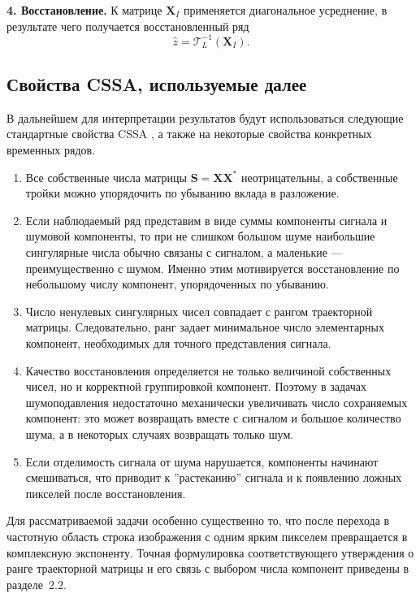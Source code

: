 \textbf{4. Восстановление.}
К матрице $\mathbf{X}_I$ применяется диагональное усреднение, в результате чего получается восстановленный ряд
\[
\widehat{z} = \mathcal{T}_L^{-1}(\mathbf{X}_I).
\]

\subsection*{Свойства CSSA, используемые далее}

В дальнейшем для интерпретации результатов будут использоваться следующие стандартные свойства CSSA \cite{ts_structure,ssa_with_r,zhornikova2016}, а также на некоторые свойства конкретных временных рядов.

\begin{enumerate}
	\item Все собственные числа матрицы $\mathbf{S}=\mathbf{X}\mathbf{X}^{*}$ неотрицательны, а собственные тройки можно упорядочить по убыванию вклада в разложение.
	\item Если наблюдаемый ряд представим в виде суммы компоненты сигнала и шумовой компоненты, то при не слишком большом шуме наибольшие сингулярные числа обычно связаны с сигналом, а маленькие --- преимущественно с шумом. Именно этим мотивируется восстановление по небольшому числу компонент, упорядоченных по убыванию.
	\item Число ненулевых сингулярных чисел совпадает с рангом траекторной матрицы. Следовательно, ранг задает минимальное число элементарных компонент, необходимых для точного представления сигнала.
	\item Качество восстановления определяется не только величиной собственных чисел, но и корректной группировкой компонент. Поэтому в задачах шумоподавления недостаточно механически увеличивать число сохраняемых компонент: это может возвращать вместе с сигналом и большое количество шума, а в некоторых случаях возвращать только шум.
	\item Если отделимость сигнала от шума нарушается, компоненты начинают смешиваться, что приводит к ''растеканию'' сигнала и к появлению ложных пикселей после восстановления.
\end{enumerate}

Для рассматриваемой задачи особенно существенно то, что после перехода в частотную область строка изображения с одним ярким пикселем превращается в комплексную экспоненту. Точная формулировка соответствующего утверждения о ранге траекторной матрицы и его связь с выбором числа компонент приведены в разделе~2.2.

